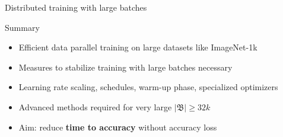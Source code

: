\begin{frame}{Distributed training with large batches}
\protect\hypertarget{distributed-training-with-large-batches-1}{}
\begin{block}{Summary}
\protect\hypertarget{summary}{}
\begin{itemize}
\tightlist
\item
  Efficient data parallel training on large datasets like ImageNet-1k
\item
  Measures to stabilize training with large batches necessary
\item
  Learning rate scaling, schedules, warm-up phase, specialized
  optimizers
\item
  Advanced methods required for very large
  \(\vert \mathfrak{B} \vert \geq 32k\)
\item
  Aim: reduce \textbf{time to accuracy} without accuracy loss
\end{itemize}
\end{block}

\end{frame}
